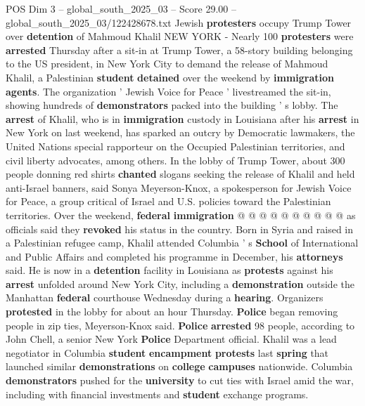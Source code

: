 \begin{textsample}{POS Dim 3 – global\_south\_2025\_03 – Score 29.00 – global\_south\_2025\_03/122428678.txt}  \label{ex:f3_pos_036}
Jewish \textbf{protesters} occupy Trump Tower over \textbf{detention} of Mahmoud Khalil NEW YORK - Nearly 100 \textbf{protesters} were \textbf{arrested} Thursday after a sit-in at Trump Tower, a 58-story building belonging to the US president, in New York City to demand the release of Mahmoud Khalil, a Palestinian \textbf{student} \textbf{detained} over the weekend by \textbf{immigration} \textbf{agents}.
The organization ' Jewish Voice for Peace ' livestreamed the sit-in, showing hundreds of \textbf{demonstrators} packed into the building ' s lobby.
The \textbf{arrest} of Khalil, who is in \textbf{immigration} custody in Louisiana after his \textbf{arrest} in New York on last weekend, has sparked an outcry by Democratic lawmakers, the United Nations special rapporteur on the Occupied Palestinian territories, and civil liberty advocates, among others.
In the lobby of Trump Tower, about 300 people donning red shirts \textbf{chanted} slogans seeking the release of Khalil and held anti-Israel banners, said Sonya Meyerson-Knox, a spokesperson for Jewish Voice for Peace, a group critical of Israel and U.S. policies toward the Palestinian territories.
Over the weekend, \textbf{federal} \textbf{immigration} @ @ @ @ @ @ @ @ @ @ as officials said they \textbf{revoked} his status in the country.
Born in Syria and raised in a Palestinian refugee camp, Khalil attended Columbia ' s \textbf{School} of International and Public Affairs and completed his programme in December, his \textbf{attorneys} said.
He is now in a \textbf{detention} facility in Louisiana as \textbf{protests} against his \textbf{arrest} unfolded around New York City, including a \textbf{demonstration} outside the Manhattan \textbf{federal} courthouse Wednesday during a \textbf{hearing}.
Organizers \textbf{protested} in the lobby for about an hour Thursday. \textbf{Police} began removing people in zip ties, Meyerson-Knox said. \textbf{Police} \textbf{arrested} 98 people, according to John Chell, a senior New York \textbf{Police} Department official.
Khalil was a lead negotiator in Columbia \textbf{student} \textbf{encampment} \textbf{protests} last \textbf{spring} that launched similar \textbf{demonstrations} on \textbf{college} \textbf{campuses} nationwide.
Columbia \textbf{demonstrators} pushed for the \textbf{university} to cut ties with Israel amid the war, including with financial investments and \textbf{student} exchange programs.

\end{textsample}
